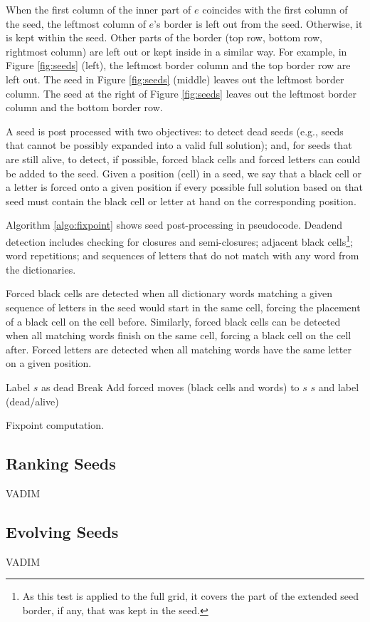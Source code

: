 When the first column of the inner part of $e$ coincides 
with the first column of the seed, the leftmost column of $e$'s border
is left out from the seed. 
Otherwise, it is kept within the seed.
Other parts of the border (top row, bottom row, rightmost column)
are left out or kept inside in a similar way.
For example, in Figure \ref{fig:seeds} (left), the leftmost border column 
and the top border row are left out.
The seed in Figure \ref{fig:seeds} (middle) leaves out the
leftmost border column.
The seed at the right of Figure \ref{fig:seeds} leaves out
the leftmost border column and the bottom border row.


A seed is post processed with two objectives: to detect dead seeds 
(e.g., seeds that cannot be possibly expanded into a valid full solution); 
and, for seeds that are still alive, to detect, if possible, 
forced black cells and forced letters can could be added to the seed.
Given a position (cell) in a seed,
we say that a black cell or a letter is forced onto a 
given position if 
every possible full solution based on that seed must contain 
the black cell or letter at hand on the corresponding position.

Algorithm \ref{algo:fixpoint} shows seed post-processing in pseudocode.
Deadend detection includes checking for closures and semi-closures;
adjacent black cells\footnote{As this test is applied to the full
grid, it covers the part of the extended seed border, if any, that was
kept in the seed.}; 
word repetitions; and
sequences of letters that do not match with any word from the dictionaries.

Forced black cells are detected when all dictionary words matching 
a given sequence of letters in the seed would start in the same cell,
forcing the placement of a black cell on the cell before.
Similarly, forced black cells can be detected when 
all matching words finish on the same cell, forcing a black cell 
on the cell after.
Forced letters are detected when all matching words have the same 
letter on a given position.


\begin{algorithm}[t]
\DontPrintSemicolon %
 {
     {
        Label $s$ as dead\;
        Break\;
    }
    Add forced moves (black cells and words) to $s$\;
}
\Return $s$ and label (dead/alive)
\caption{{\sc Fixpoint computation.}}
\label{algo:fixpoint}
\end{algorithm}

\subsection{Ranking Seeds}

VADIM

\subsection{Evolving Seeds}

VADIM